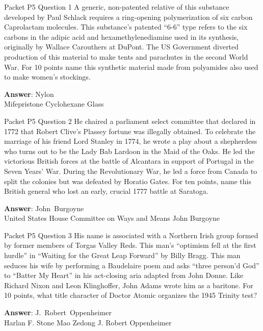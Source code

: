\begin{frame}{Packet P5 Question 1}
A generic, non-patented   relative of this substance developed by Paul Schlack requires a ring-opening polymerization of six carbon Caprolactam   molecules. This substance’s patented “6-6” type refers to the six carbons in the adipic acid and hexamethylenediamine   used in its synthesis, originally by Wallace Carouthers at DuPont. The US Government   diverted production of this material to make tents and parachutes in the second   World War. For 10 points name this synthetic material made from polyamides also used to make women’s stockings.  

\textbf{Answer}: Nylon\\
 Mifepristone
 Cyclohexane
 Glass
\end{frame}

\begin{frame}{Packet P5 Question 2}
He chaired a parliament   select committee that declared in 1772 that Robert Clive's Plassey fortune was illegally obtained. To celebrate the marriage of his friend Lord Stanley in 1774, he wrote a play about a shepherdess who turns out to be the Lady Bab Lardoon in the Maid of the Oaks.  He led the victorious       British forces at the battle of Alcantara  in support of Portugal in the Seven Years' War.  During the Revolutionary War, he led a force from Canada to split the colonies but was defeated by Horatio Gates.  For ten points, name this British general who lost an early, crucial 1777 battle at Saratoga.  

\textbf{Answer}: John\ Burgoyne\\
 United States House Committee on Ways and Means
 John Burgoyne
\end{frame}

\begin{frame}{Packet P5 Question 3}
His name is associated   with a Northern Irish group formed by former members of Torgas Valley Reds.  This man’s “optimism fell at the first hurdle” in ``Waiting for the Great Leap Forward'' by Billy Bragg.   This man seduces his wife by performing a Baudelaire poem and asks “three person’d God” to “Batter My Heart” in his act-closing aria adapted from John Donne. Like Richard Nixon and Leon Klinghoffer, John Adams wrote him as a baritone. For 10 points, what title character of Doctor Atomic organizes the   1945 Trinity test?  

\textbf{Answer}: J.\ Robert\ Oppenheimer\\
 Harlan F. Stone
 Mao Zedong
 J. Robert Oppenheimer
\end{frame}

